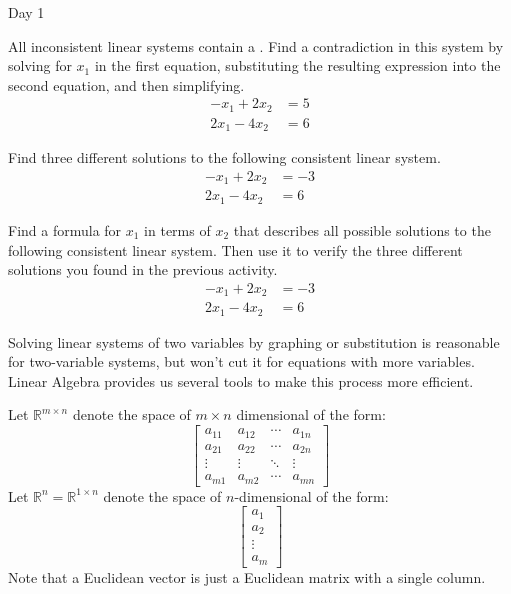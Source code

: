 \begin{applicationActivities}{Day 1}
\begin{activity}
  All inconsistent linear systems contain a .
  Find a contradiction in this system by solving for \(x_1\) in the first
  equation, substituting the resulting expression into the
  second equation, and then simplifying.
  \begin{align*}
  -x_1+2x_2  &=  5 \\
  2x_1-4x_2  &=  6
  \end{align*}
\end{activity}

\begin{activity}
  Find three different solutions to the following consistent linear system.
  \begin{align*}
  -x_1+2x_2  &= -3 \\
  2x_1-4x_2  &=  6
  \end{align*}
\end{activity}

\begin{activity}
  Find a formula for \(x_1\) in terms of \(x_2\) that describes all possible
  solutions to the following consistent linear system. Then use it to
  verify the three different solutions you found in the previous activity.
  \begin{align*}
  -x_1+2x_2  &= -3 \\
  2x_1-4x_2  &=  6
  \end{align*}
\end{activity}

\begin{observation}
  Solving linear systems of two variables by graphing or substitution is
  reasonable for two-variable systems, but won't cut it for equations with
  more variables. Linear Algebra provides us several tools to make this
  process more efficient.
\end{observation}

\begin{definition}
  Let \(\mathbb R^{m\times n}\) denote the space of \(m\times n\)
  dimensional  of the form:
  \[
  \begin{bmatrix}
    a_{11} & a_{12} & \cdots & a_{1n} \\
    a_{21} & a_{22} & \cdots & a_{2n} \\
    \vdots & \vdots & \ddots & \vdots \\
    a_{m1} & a_{m2} & \cdots & a_{mn}
  \end{bmatrix}
  \]
  Let \(\mathbb R^{n}=\mathbb R^{1\times n}\) denote the space of
  \(n\)-dimensional  of the form:
  \[
  \begin{bmatrix}
    a_{1} \\
    a_{2} \\
    \vdots \\
    a_{m}
  \end{bmatrix}
  \]
  Note that a Euclidean vector is just a Euclidean matrix with a single column.
\end{definition}


\end{applicationActivities}
